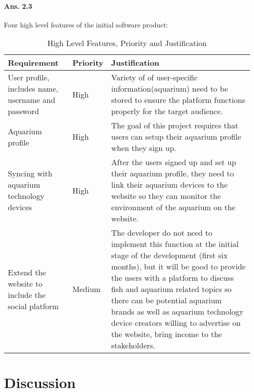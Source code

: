 \documentclass[paper=a4, fontsize=11pt]{scrartcl} %
\numberwithin{equation}{section} %
\numberwithin{figure}{section} %
\numberwithin{table}{section} %
\begin{document}
\paragraph{Ans. 2.3}Four high level features of the initial software product:

\begin{table}[htbp]
    \centering
    \caption{High Level Features, Priority and Justification }
    \begin{tabular}{p{2in}p{0.5in}p{2in}}
    \hline
    Requirement &Priority &Justification \\
    \hline 
    User profile, includes name, username and password & High & Variety of of user-specific information(aquarium) need to be stored to ensure the platform functions properly for the target audience\cite{userprofile}. \\
    \hline
     Aquarium profile & High & The goal of this project requires that users can setup their aquarium profile when they sign up.\\
     \hline
     Syncing with aquarium technology devices& High & After the users signed up and set up their aquarium profile, they need to link their aquarium devices to the website so they can monitor the environment of the aquarium on the website.\\
     \hline
      Extend the website to include the social platform& Medium &The developer do not need to implement this function at the initial stage of the development (first six months), but it will be good to provide the users with a platform to discuss fish and aquarium related topics so there can be potential aquarium brands as well as aquarium technology device creators willing to advertise on the website, bring income to the stakeholders. \\
    \hline
    \end{tabular}
\end{table}


\newpage
\section{Discussion}
\end{document}
